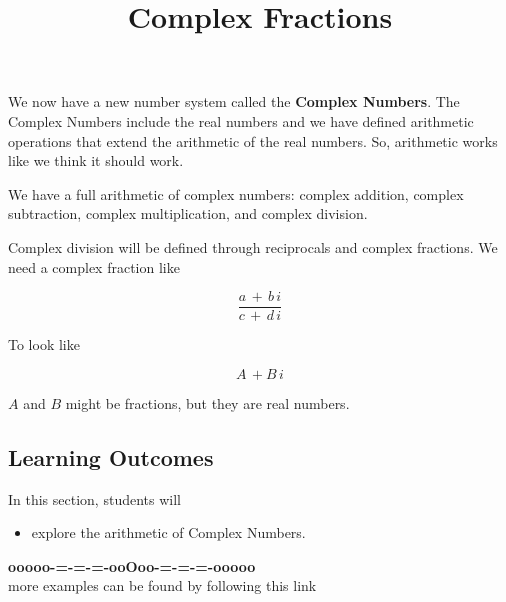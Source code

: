 \documentclass{ximera}
\title{Complex Fractions}
\begin{document}
\begin{abstract}
\end{abstract}
\maketitle







We now have a new number system called the \textbf{Complex Numbers}.  The Complex Numbers include the real numbers and we have defined arithmetic operations that extend the arithmetic of the real numbers.  So, arithmetic works like we think it should work.

We have a full arithmetic of complex numbers: complex addition, complex subtraction, complex multiplication, and complex division.



Complex division will be defined through reciprocals and complex fractions.  We need a complex fraction like

\[  \frac{a \, + \, b \, i}{c \, + \, d \, i}     \]


To look like

\[  A \, + B \, i    \]

$A$ and $B$ might be fractions, but they are real numbers. \\



\subsection*{Learning Outcomes}

\begin{sectionOutcomes}
In this section, students will 

\begin{itemize}
\item explore the arithmetic of Complex Numbers.
\end{itemize}
\end{sectionOutcomes}











\begin{center}
\textbf{\textcolor{green!50!black}{ooooo-=-=-=-ooOoo-=-=-=-ooooo}} \\

more examples can be found by following this link\\ 

\end{center}
\end{document}
